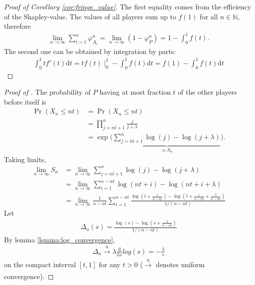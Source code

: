 \documentclass[a4paper]{article}
\newcommand{\dt}{\mathrm{d}t}
\begin{document}
\begin{proof}[Proof of Corollary \ref{cor:fringe_value}]
    The first equality comes from the efficiency of the Shapley-value.
    The values of all players sum up to $f(1)$ for all $n \in \mathbb{N}$, therefore
    \begin{align*}
        \lim_{n \to \infty} \sum_{i=1}^n \varphi_{A_i}^n = \lim_{n \to \infty} (1 - \varphi_P^n ) = 1 - \int_0^1 f(t).
    \end{align*}
    The second one can be obtained by integration by parts:
    \begin{align*}
        \int_0^1 t f'(t) \dt = tf(t) \mid_0^1 - \int_0^1 f(t) \dt = f(1) - \int_0^1 f(t) \dt
    \end{align*}
\end{proof}

\begin{proof}[Proof of ] %
    The probability of $P$ having at most fraction $t$ of the other players before itself is
    \begin{align*}
        \Pr(X_n \leq nt) &= \Pr(X_n \leq nt ) \\
        &= \prod_{j = nt + 1}^n \frac{j}{j + \lambda} \\
        &= \exp \Bigg( \underbrace{\sum_{j = nt + 1}^n \log(j) - \log(j+\lambda)}_{\equiv S_n} \Bigg).
    \end{align*}
    Taking limits,
    \begin{align*}
        \lim_{n \to \infty} S_n &= \lim_{n \to \infty} \sum_{j = nt + 1}^n \log(j) - \log(j+\lambda) \\
        &= \lim_{n \to \infty} \sum_{i = 1}^{n - nt} \log(nt + i) - \log(nt + i + \lambda) \\
        &= \lim_{n \to \infty} \frac{1}{n - nt} \sum_{i = 1}^{n - nt} \frac{\log \left( t + \frac{i}{n - nt} \right) - \log \left( t + \frac{i}{n - nt} + \frac{\lambda}{n - nt} \right)}{1 / (n - nt)}
    \end{align*}
    Let
    \begin{align*}
        \Delta_n(s) = \frac{\log \left( s \right) - \log \left( s + \frac{\lambda}{n - nt} \right)}{1 / (n - nt)}
    \end{align*}
    By lemma \ref{lemma:log_convergence}, 
    \begin{align*}
        \Delta_n \xrightarrow[]{\mathrm{u}} \lambda \frac{\mathrm{d}}{\mathrm{d}s}log(s) = -\frac{\lambda}{s}
    \end{align*}
    on the compact interval $[t, 1]$ for any $t > 0$ ($\xrightarrow[]{\mathrm{u}}$ denotes uniform convergence).
    

\end{proof}
\end{document}
